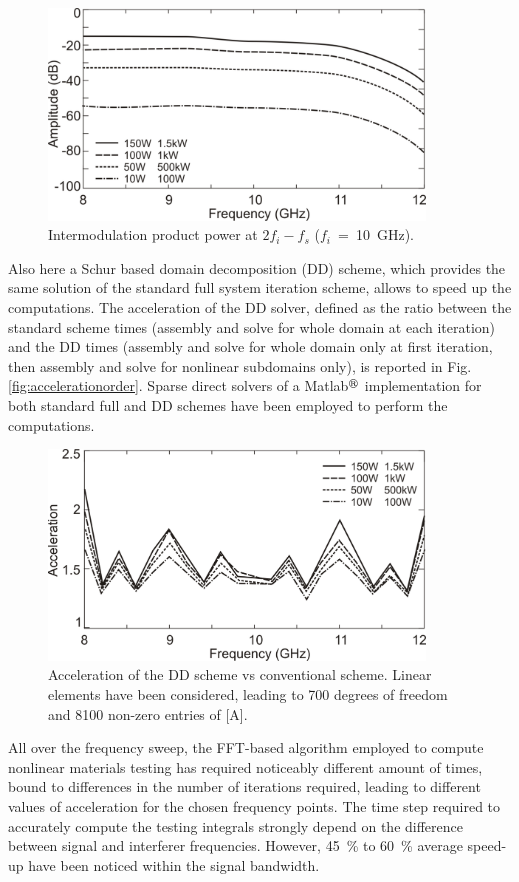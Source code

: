 \begin{figure}[!ht]
\centering
\includegraphics[width=10cm]{f2}
\caption{Intermodulation product power at $2 f_i - f_s$ ($f_i$~=~10~GHz).}
\label{fig:f2}
\end{figure}

Also here a Schur based domain decomposition (DD) scheme, which provides the same solution of the standard full system iteration scheme, allows to speed up the computations. The acceleration of the DD solver, defined as the ratio between the standard scheme times (assembly and solve for whole domain at each iteration) and the DD times (assembly and solve for whole domain only at first iteration, then assembly and solve for nonlinear subdomains only), is reported in Fig. \ref{fig:accelerationorder}. Sparse direct solvers of a Matlab${}^\text{\circledR}$ implementation for both standard full and DD schemes have been employed to perform the computations.
%
\begin{figure}[!ht]
\centering
\includegraphics[width=10cm]{acccirc}
\caption{Acceleration of the DD scheme vs conventional scheme. Linear elements have been considered,
leading to 700 degrees of freedom and 8100 non-zero entries of [A].}
\label{fig:acccirc}
\end{figure}
%
All over the frequency sweep, the FFT-based algorithm employed to compute nonlinear materials testing has
required noticeably different amount of times, bound to differences in the number of iterations required,
leading to different values of acceleration for the chosen frequency points. The time step required to
accurately compute the testing integrals strongly depend on the difference between signal and interferer
frequencies. However, 45~\% to 60~\% average speed-up have been noticed within the signal bandwidth.

